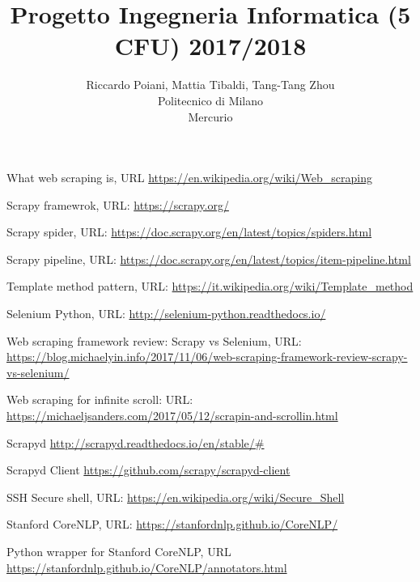 \documentclass[a4paper]{article}
\begin{document}
\title{Progetto Ingegneria Informatica (5 CFU) 2017/2018}
\author{
        Riccardo Poiani, Mattia Tibaldi, Tang-Tang Zhou \\
        Politecnico di Milano\\  
        Mercurio              
}
\maketitle
\newpage
\tableofcontents
{}
\newpage


\newpage

\newpage

\newpage

\clearpage
\begin{thebibliography}{9}
What web scraping is, URL \url{https://en.wikipedia.org/wiki/Web_scraping}

Scrapy framewrok, URL: \url{https://scrapy.org/}

Scrapy spider, URL: \url{https://doc.scrapy.org/en/latest/topics/spiders.html}

Scrapy pipeline, URL: \url{https://doc.scrapy.org/en/latest/topics/item-pipeline.html}

Template method pattern, URL: \url{https://it.wikipedia.org/wiki/Template_method}

Selenium Python, URL: \url{http://selenium-python.readthedocs.io/}

Web scraping framework review: Scrapy vs Selenium, URL: \url{https://blog.michaelyin.info/2017/11/06/web-scraping-framework-review-scrapy-vs-selenium/}

Web scraping for infinite scroll: URL: \url{https://michaeljsanders.com/2017/05/12/scrapin-and-scrollin.html}

Scrapyd \url{http://scrapyd.readthedocs.io/en/stable/#}

Scrapyd Client \url{https://github.com/scrapy/scrapyd-client}

SSH Secure shell, URL: \url{https://en.wikipedia.org/wiki/Secure_Shell}

Stanford CoreNLP, URL: \url{https://stanfordnlp.github.io/CoreNLP/}

Python wrapper for Stanford CoreNLP, URL \url{https://stanfordnlp.github.io/CoreNLP/annotators.html}


\end{thebibliography}
\end{document}

